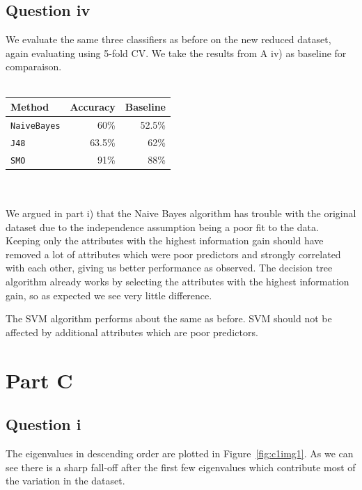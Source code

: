 \documentclass[a4paper]{article}
\begin{document}
\subsection*{Question iv}
We evaluate the same three classifiers as before on the new reduced dataset, again evaluating using 5-fold CV. We take the results from A iv) as baseline for comparaison.\\
\\
\begin{tabular}{lrr}
Method & Accuracy & Baseline \\
\hline
{\tt NaiveBayes} & 60\% & 52.5\% \\
{\tt J48} & 63.5\% & 62\% \\
{\tt SMO} & 91\% & 88\%
\end{tabular}\\
\\
We argued in part i) that the Naive Bayes algorithm has trouble with the original dataset due to the independence assumption being a poor fit to the data. Keeping only the attributes with the highest information gain should have removed a lot of attributes which were poor predictors and strongly correlated with each other, giving us better performance as observed.
The decision tree algorithm already works by selecting the attributes with the highest information gain, so as expected we see very little difference.

The SVM algorithm performs about the same as before. SVM should not be affected by additional attributes which are poor predictors.

\section*{Part C}
\subsection*{Question i}

The eigenvalues in descending order are plotted in Figure~\ref{fig:c1img1}. As we can see there is a sharp fall-off after the first few eigenvalues which contribute most of the variation in the dataset.
\end{document}
